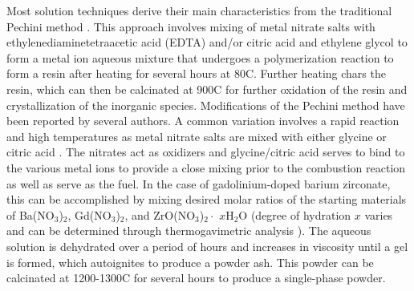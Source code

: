 Most solution techniques derive their main characteristics from the traditional Pechini method \cite{Pechini1967}. This approach involves mixing of metal nitrate salts with ethylenediaminetetraacetic acid (EDTA) and/or citric acid and ethylene glycol to form a metal ion aqueous mixture that undergoes a polymerization reaction to form a resin after heating for several hours at 80\textdegree C. Further heating chars the resin, which can then be calcinated at 900\textdegree C for further oxidation of the resin and crystallization of the inorganic species. Modifications of the Pechini method have been reported by several authors. A common variation involves a rapid reaction and high temperatures as metal nitrate salts are mixed with either glycine \cite{Chick1990} or citric acid \cite{Gilardi2017}. The nitrates act as oxidizers and glycine/citric acid serves to bind to the various metal ions to provide a close mixing prior to the combustion reaction as well as serve as the fuel. In the case of gadolinium-doped barium zirconate, this can be accomplished by mixing desired molar ratios of the starting materials of Ba(NO$_3$)$_2$, Gd(NO$_3$)$_2$, and ZrO(NO$_3$)$_2 \cdot$ $x$H$_2$O (degree of hydration $x$ varies and can be determined through thermogavimetric analysis \cite{Babilo2007b}). The aqueous solution is dehydrated over a period of hours and increases in viscosity until a gel is formed, which autoignites to produce a powder ash. This powder can be calcinated at 1200-1300\textdegree C for several hours to produce a single-phase powder. 

